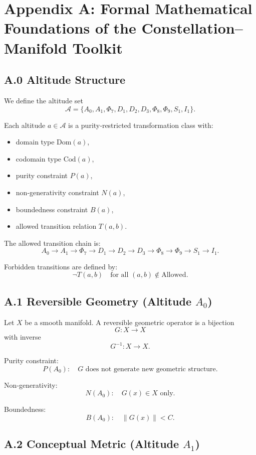 \appendix
\section*{Appendix A: Formal Mathematical Foundations of the Constellation–Manifold Toolkit}

\subsection*{A.0 Altitude Structure}

We define the altitude set
\[
\mathcal{A} = 
\{A_0, A_1, \Phi_7, D_1, D_2, D_3, \Phi_8, \Phi_9, S_1, I_1\}.
\]

Each altitude $a \in \mathcal{A}$ is a purity‑restricted transformation class with:
\begin{itemize}
    \item domain type $\mathrm{Dom}(a)$,
    \item codomain type $\mathrm{Cod}(a)$,
    \item purity constraint $P(a)$,
    \item non‑generativity constraint $N(a)$,
    \item boundedness constraint $B(a)$,
    \item allowed transition relation $T(a,b)$.
\end{itemize}

The allowed transition chain is:
\[
A_0 \to A_1 \to \Phi_7 \to D_1 \to D_2 \to D_3 \to 
\Phi_8 \to \Phi_9 \to S_1 \to I_1.
\]

Forbidden transitions are defined by:
\[
\neg T(a,b) \quad \text{for all } (a,b) \notin \text{Allowed}.
\]

\subsection*{A.1 Reversible Geometry (Altitude $A_0$)}

Let $X$ be a smooth manifold.  
A reversible geometric operator is a bijection
\[
G : X \to X
\]
with inverse
\[
G^{-1} : X \to X.
\]

Purity constraint:
\[
P(A_0):\quad G \text{ does not generate new geometric structure.}
\]

Non‑generativity:
\[
N(A_0):\quad G(x) \in X \text{ only.}
\]

Boundedness:
\[
B(A_0):\quad \|G(x)\| < C.
\]

\subsection*{A.2 Conceptual Metric (Altitude $A_1$)}

